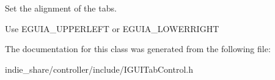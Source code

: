 Set the alignment of the tabs. 

Use E\+G\+U\+I\+A\+\_\+\+U\+P\+P\+E\+R\+L\+E\+FT or E\+G\+U\+I\+A\+\_\+\+L\+O\+W\+E\+R\+R\+I\+G\+HT 

The documentation for this class was generated from the following file\+:\begin{DoxyCompactItemize}
\item 
indie\+\_\+share/controller/include/I\+G\+U\+I\+Tab\+Control.\+h\end{DoxyCompactItemize}
